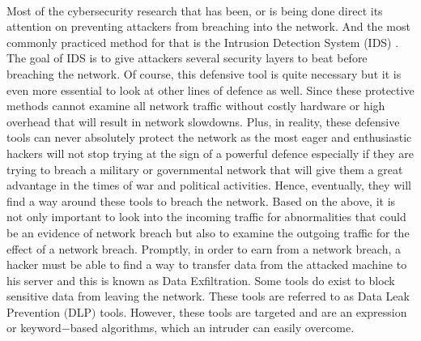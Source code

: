 \documentclass[main.tex]{subfiles}
\begin{document}
\paragraph{}
Most of the cybersecurity research that has been, or is being done direct its attention on preventing attackers from breaching into the network. And the most commonly practiced method for that is the Intrusion Detection System (IDS) \cite{liu2010data}. The goal of IDS is to give attackers several security layers to beat before breaching the network. Of course, this defensive tool is quite necessary but it is even more essential to look at other lines of defence as well. Since these protective methods cannot examine all network traffic without costly hardware or high overhead that will result in network slowdowns. Plus, in reality, these defensive tools can never absolutely protect the network as the most eager and enthusiastic hackers will not stop trying at the sign of a powerful defence especially if they are trying to breach a military or governmental network that will give them a great advantage in the times of war and political activities. Hence, eventually, they will find a way around these tools to breach the network. Based on the above, it is not only important to look into the incoming traffic for abnormalities that could be an evidence of network breach but also to examine the outgoing traffic for the effect of a network breach. Promptly, in order to earn from a network breach, a hacker must be able to find a way to transfer data from the attacked machine to his server and this is known as Data Exfiltration. Some tools do exist to block sensitive data from leaving the network. These tools are referred to as Data Leak Prevention $($DLP$)$ tools. However, these tools are targeted and are an expression or keyword$-$based algorithms, which an intruder can easily overcome.\
\end{document}
